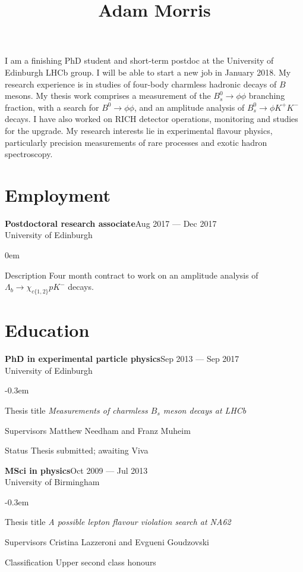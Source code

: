 \documentclass[contbibnum,titleabove]{simplecv}
\title{Adam Morris}
\newcommand\dateditem[2]{#1\hfill#2\\}
\newcommand\topictitle[3]{\dateditem{{\textbf{#1}}}{#3}#2}
\begin{document}
	\maketitle
	\fontfamily{\typeface}\selectfont
	I am a finishing PhD student and short-term postdoc at the University of Edinburgh LHCb group.
	I will be able to start a new job in January 2018.
	My research experience is in studies of four-body charmless hadronic decays of $B$ mesons.
	My thesis work comprises a measurement of the $B^0_s \to \phi \phi$ branching fraction, with a search for $B^0 \to \phi \phi$, and an amplitude analysis of $B^0_s \to \phi K^{+}K^{-}$ decays.
	I have also worked on RICH detector operations, monitoring and studies for the upgrade.
	My research interests lie in experimental flavour physics, particularly precision measurements of rare processes and exotic hadron spectroscopy.
	\section{Employment}
	\topictitle{Postdoctoral research associate}{University of Edinburgh}{Aug 2017 --- Dec 2017}
	\begin{topic}
		\topsep0em
		\item[Description]{Four month contract to work on an amplitude analysis of $\Lambda_b \to \chi_{c\{1,2\}} p K^{-}$ decays.}
	\end{topic}
	\section{Education}
	\topictitle{PhD in experimental particle physics}{University of Edinburgh}{Sep 2013 --- Sep 2017}
	\begin{topic}
	\itemsep-0.3em
		\item[Thesis title]{\textit{Measurements of charmless $B_s$ meson decays at LHCb}}
		\item[Supervisors]{Matthew Needham and Franz Muheim}
		\item[Status]{Thesis submitted; awaiting Viva}
	\end{topic}
	\topictitle{MSci in physics}{University of Birmingham}{Oct 2009 --- Jul 2013}
	\begin{topic}
	\itemsep-0.3em
		\item[Thesis title]{\textit{A possible lepton flavour violation search at NA62}}
		\item[Supervisors]{Cristina Lazzeroni and Evgueni Goudzovski}
		\item[Classification]{Upper second class honours}
	\end{topic}
\end{document}
